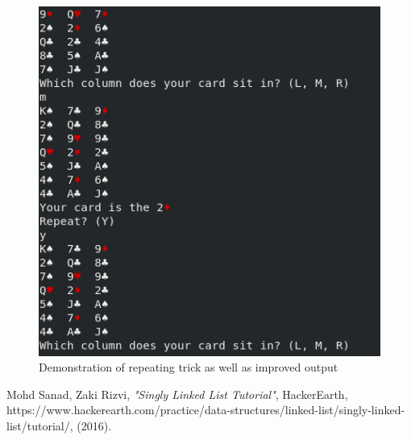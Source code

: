 \documentclass[11]{article}
\begin{document}
		\begin{figure}[h]
					\caption{Demonstration of repeating trick as well as improved output}				\centering
					\includegraphics[scale=0.5]{Repeat.png}
		\end{figure}
			
			
		
	\begin{thebibliography}{1}
  		 Mohd Sanad, Zaki Rizvi, \textit{"Singly Linked List Tutorial"}, HackerEarth, https://www.hackerearth.com/practice/data-structures/linked-list/singly-linked-list/tutorial/, (2016).
  	\end{thebibliography}
		
\end{document}
